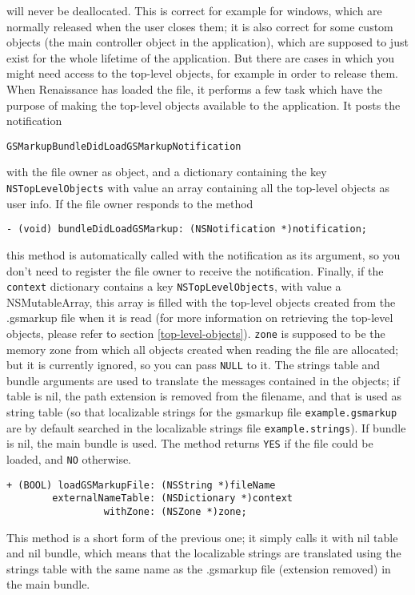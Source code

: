 will never be deallocated.  This is correct for example for windows,
which are normally released when the user closes them; it is also
correct for some custom objects (the main controller object in the
application), which are supposed to just exist for the whole lifetime
of the application.  But there are cases in which you might need
access to the top-level objects, for example in order to release them.
When Renaissance has loaded the file, it performs a few task which
have the purpose of making the top-level objects available to the
application.  It posts the notification
\begin{verbatim}
GSMarkupBundleDidLoadGSMarkupNotification
\end{verbatim}
with the file owner as object, and a dictionary containing the key
\texttt{NSTopLevelObjects} with value an array containing all the 
top-level objects as user info.  If the file owner responds to the
method
\begin{verbatim}
- (void) bundleDidLoadGSMarkup: (NSNotification *)notification;
\end{verbatim}
this method is automatically called with the notification as its
argument, so you don't need to register the file owner to receive the
notification.  Finally, if the \texttt{context} dictionary contains a
key \texttt{NSTopLevelObjects}, with value a NSMutableArray, this
array is filled with the top-level objects created from the .gsmarkup
file when it is read (for more information on retrieving the top-level
objects, please refer to section \ref{top-level-objects}).
\texttt{zone} is supposed to be the memory zone from which all objects
created when reading the file are allocated; but it is currently
ignored, so you can pass \texttt{NULL} to it.  The strings table and
bundle arguments are used to translate the messages contained in the
objects; if table is nil, the path extension is removed from the
filename, and that is used as string table (so that localizable
strings for the gsmarkup file \texttt{example.gsmarkup} are by default
searched in the localizable strings file
\texttt{example.strings}).  If bundle is nil, the main bundle is used.
The method returns \texttt{YES} if the file could be loaded, and
\texttt{NO} otherwise.

\begin{verbatim}
+ (BOOL) loadGSMarkupFile: (NSString *)fileName
        externalNameTable: (NSDictionary *)context
                 withZone: (NSZone *)zone;
\end{verbatim}
This method is a short form of the previous one; it simply calls it
with nil table and nil bundle, which means that the localizable
strings are translated using the strings table with the same name as
the .gsmarkup file (extension removed) in the main bundle.

